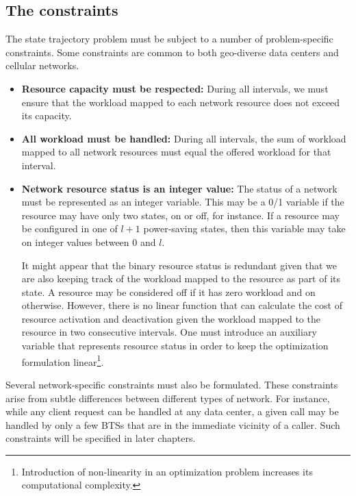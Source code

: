 \subsection{The constraints}
\label{subsec:framework:constraints} %
The state trajectory problem must be subject to a number of problem-specific constraints. Some constraints are common to both geo-diverse data centers and cellular networks. 

\begin{itemize}
\item \textbf{Resource capacity must be respected:} During all intervals, we must ensure that the workload mapped to each network resource does not exceed its capacity.
\item \textbf{All workload must be handled:} During all intervals, the sum of workload mapped to all network resources must equal the offered workload for that interval.
\item \textbf{Network resource status is an integer value:} The status of a network must be represented as an integer variable. This may be a 0/1 variable if the resource may have only two states, on or off, for instance. If a resource may be configured in one of $l+1$ power-saving states, then this variable may take on integer values between $0$ and $l$. 

It might appear that the binary resource status is redundant given that we are also keeping track of the workload mapped to the resource as part of its state. A resource may be considered off if it has zero workload and on otherwise. However, there is no linear function that can calculate the cost of resource activation and deactivation given the workload mapped to the resource in two consecutive intervals. One must introduce an auxiliary variable that represents resource status in order to keep the optimization formulation linear\footnote{Introduction of non-linearity in an optimization problem increases its computational complexity.}. 
\end{itemize}

Several network-specific constraints must also be formulated. These constraints arise from subtle differences between different types of network. For instance, while any client request can be handled at any data center, a given call may be handled by only a few BTSs that are in the immediate vicinity of a caller. Such constraints will be specified in later chapters.

